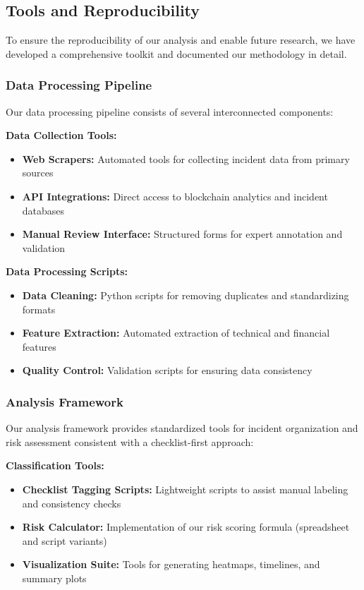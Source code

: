 \subsection{Tools and Reproducibility}
\label{sec:tools_and_reproducibility}

To ensure the reproducibility of our analysis and enable future research, we have developed a comprehensive toolkit and documented our methodology in detail.

\subsubsection{Data Processing Pipeline}
Our data processing pipeline consists of several interconnected components:

\textbf{Data Collection Tools:}
\begin{itemize}
    \item \textbf{Web Scrapers:} Automated tools for collecting incident data from primary sources
    \item \textbf{API Integrations:} Direct access to blockchain analytics and incident databases
    \item \textbf{Manual Review Interface:} Structured forms for expert annotation and validation
\end{itemize}

\textbf{Data Processing Scripts:}
\begin{itemize}
    \item \textbf{Data Cleaning:} Python scripts for removing duplicates and standardizing formats
    \item \textbf{Feature Extraction:} Automated extraction of technical and financial features
    \item \textbf{Quality Control:} Validation scripts for ensuring data consistency
\end{itemize}

\subsubsection{Analysis Framework}
Our analysis framework provides standardized tools for incident organization and risk assessment consistent with a checklist-first approach:

\textbf{Classification Tools:}
\begin{itemize}
    \item \textbf{Checklist Tagging Scripts:} Lightweight scripts to assist manual labeling and consistency checks
    \item \textbf{Risk Calculator:} Implementation of our risk scoring formula (spreadsheet and script variants)
    \item \textbf{Visualization Suite:} Tools for generating heatmaps, timelines, and summary plots
\end{itemize}

